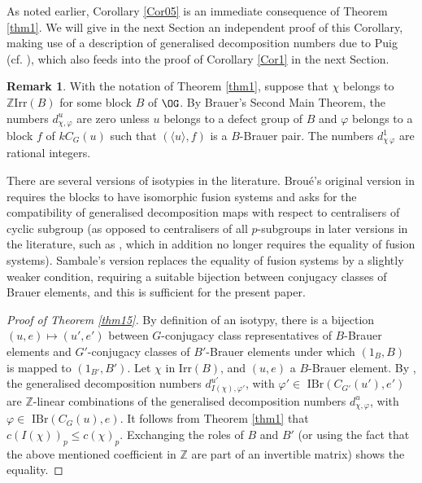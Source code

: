 \documentclass{amsart} %
\theoremstyle{plain}\newtheorem{Theorem}{Theorem}[section]
\theoremstyle{plain}\newtheorem{Conjecture}[Theorem]{Conjecture}
\theoremstyle{plain}\newtheorem{Corollary}[Theorem]{Corollary}
\theoremstyle{plain}\newtheorem{Lemma}[Theorem]{Lemma}
\theoremstyle{plain}\newtheorem{Proposition}[Theorem]{Proposition}
\theoremstyle{definition}\newtheorem{Definition}[Theorem]{Definition}
\theoremstyle{definition}\newtheorem{Example}[Theorem]{Example}
\theoremstyle{definition}\newtheorem{Examples}[Theorem]{Examples}
\theoremstyle{definition}\newtheorem{Remark}[Theorem]{Remark}
\theoremstyle{definition}\newtheorem{Remarks}[Theorem]{Remarks}
\theoremstyle{plain}\newtheorem{Statement}[Theorem]{}
\def\Z{{\mathbb Z}}
\def\IBr{\mathrm{IBr}}
\def\Irr{\mathrm{Irr}}           \def\tenK{\otimes_K}
\begin{document}
As noted earlier, Corollary \ref{Cor05} is an immediate consequence of
Theorem \ref{thm1}. We will give in the next Section an
independent proof of this Corollary, making use of a description of
generalised decomposition numbers due to Puig (cf. \cite[Theorem 5.15.3]{LiBookI}),
which also feeds into the proof of Corollary \ref{Cor1} in the next Section.



\begin{Remark}
With the notation of Theorem \ref{thm1}, suppose that $\chi$ belongs to 
$\Z\Irr(B)$  for some block $B$ of $\OG$.
By Brauer's Second Main Theorem, the numbers
$d^u_{\chi,\varphi}$ are zero unless $u$ belongs to a defect group of $B$ and
$\varphi$ belongs to a block $f$ of $kC_G(u)$ such that $(\langle u\rangle, f)$ is
a $B$-Brauer pair.  The numbers $d^1_{\chi\, \varphi}$ are rational integers. 
\end{Remark}

There are several versions of isotypies in the literature. Brou\'e's original version in
\cite{Broue90} requires the blocks to have isomorphic fusion systems and asks
for   the compatibility of generalised decomposition maps with respect to centralisers 
of cyclic subgroup (as opposed to centralisers of all $p$-subgroups in later versions 
in the literature, such as \cite{BoXu}, which in addition no longer requires the equality of fusion 
systems). Sambale's version \cite[Section 7]{Sa20}  replaces the equality of fusion systems
by a slightly weaker condition, requiring a suitable bijection between conjugacy classes of
Brauer elements, and this is sufficient for the present paper. 


\begin{proof}[Proof of Theorem \ref{thm15}]
By definition of an isotypy, there is a bijection $(u,e)\mapsto (u',e')$ between
$G$-conjugacy class representatives of $B$-Brauer elements and
$G'$-conjugacy classes of $B'$-Brauer elements under which $(1_B,B)$ is mapped
to $(1_{B'}, B')$. Let $\chi$ in $\Irr(B)$, and $(u,e)$ a $B$-Brauer element.
By \cite[Proposition 7.2]{Sa20}, the generalised decomposition numbers
$d^{u'}_{I(\chi), \varphi'}$, with $\varphi'\in$ $\IBr(C_{G'}(u'), e')$ are 
$\Z$-linear combinations of the generalised decomposition numbers
$d^u_{\chi, \varphi}$, with $\varphi\in$ $\IBr(C_G(u),e)$. It follows from
Theorem \ref{thm1} that $c(I(\chi))_p\leq c(\chi)_p$. Exchanging the roles of $B$
and $B'$   (or using the fact that the above mentioned coefficient in $\Z$ are part 
of an invertible matrix) shows the equality.
\end{proof}
\end{document}
